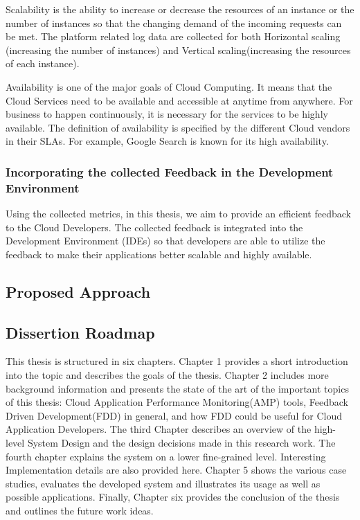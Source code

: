 \documentclass[article,type=msc,colorback,12pt,accentcolor=tud7b]{tudthesis}
\begin{document}
	\par Scalability is the ability to increase or decrease the resources of an instance or the number of instances so that the changing demand of the incoming requests can be met. The platform related log data are collected for both Horizontal scaling (increasing the number of instances) and Vertical scaling(increasing the resources of each instance).
	
	\par Availability is one of the major goals of Cloud Computing. It means that the Cloud Services need to be available and accessible at anytime from anywhere. For business to happen continuously, it is necessary for the services to be highly available. The definition of availability is specified by the different Cloud vendors in their SLAs. For example, Google Search is known for its high availability.	
	
	\subsubsection{Incorporating the collected Feedback in the Development Environment}	
	
	Using the collected metrics, in this thesis, we aim to provide an efficient feedback to the Cloud Developers. The collected feedback is integrated into the Development Environment (IDEs) so that developers are able to utilize the feedback to make their applications better scalable and highly available.	
	
	
	\subsection{Proposed Approach}
	
	\subsection{Dissertion Roadmap}

	\par This thesis is structured in six chapters. Chapter 1 provides a short introduction into the topic and describes the goals of the thesis. Chapter 2 includes more background information and presents the state of the art of the important topics of this thesis: Cloud Application Performance Monitoring(AMP) tools, Feedback Driven Development(FDD) in general, and how FDD could be useful for Cloud Application Developers. The third Chapter describes an overview of the high-level System Design and the design decisions made in this research work. The fourth chapter explains the system on a lower fine-grained level. Interesting Implementation details are also provided here. Chapter 5 shows the various case studies, evaluates the developed system and illustrates its usage as well as possible applications. Finally, Chapter six provides the conclusion of the thesis and outlines the future work ideas.
\end{document}
